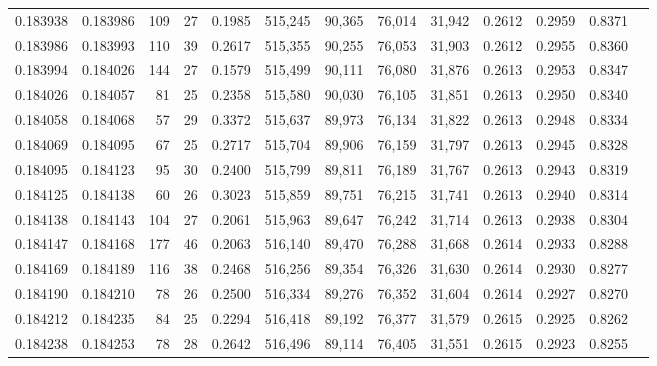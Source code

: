 \begin{tabular}{rrrrrrrrrrrrr}
0.183938 & 0.183986 &   109 &  27 &                                     0.1985 & 515,245 &  90,365 &  76,014 &  31,942 & 0.2612 & 0.2959 & 0.8371 \\
0.183986 & 0.183993 &   110 &  39 &                                     0.2617 & 515,355 &  90,255 &  76,053 &  31,903 & 0.2612 & 0.2955 & 0.8360 \\
0.183994 & 0.184026 &   144 &  27 &                                     0.1579 & 515,499 &  90,111 &  76,080 &  31,876 & 0.2613 & 0.2953 & 0.8347 \\
0.184026 & 0.184057 &    81 &  25 &                                     0.2358 & 515,580 &  90,030 &  76,105 &  31,851 & 0.2613 & 0.2950 & 0.8340 \\
0.184058 & 0.184068 &    57 &  29 &                                     0.3372 & 515,637 &  89,973 &  76,134 &  31,822 & 0.2613 & 0.2948 & 0.8334 \\
0.184069 & 0.184095 &    67 &  25 &                                     0.2717 & 515,704 &  89,906 &  76,159 &  31,797 & 0.2613 & 0.2945 & 0.8328 \\
0.184095 & 0.184123 &    95 &  30 &                                     0.2400 & 515,799 &  89,811 &  76,189 &  31,767 & 0.2613 & 0.2943 & 0.8319 \\
0.184125 & 0.184138 &    60 &  26 &                                     0.3023 & 515,859 &  89,751 &  76,215 &  31,741 & 0.2613 & 0.2940 & 0.8314 \\
0.184138 & 0.184143 &   104 &  27 &                                     0.2061 & 515,963 &  89,647 &  76,242 &  31,714 & 0.2613 & 0.2938 & 0.8304 \\
0.184147 & 0.184168 &   177 &  46 &                                     0.2063 & 516,140 &  89,470 &  76,288 &  31,668 & 0.2614 & 0.2933 & 0.8288 \\
0.184169 & 0.184189 &   116 &  38 &                                     0.2468 & 516,256 &  89,354 &  76,326 &  31,630 & 0.2614 & 0.2930 & 0.8277 \\
0.184190 & 0.184210 &    78 &  26 &                                     0.2500 & 516,334 &  89,276 &  76,352 &  31,604 & 0.2614 & 0.2927 & 0.8270 \\
0.184212 & 0.184235 &    84 &  25 &                                     0.2294 & 516,418 &  89,192 &  76,377 &  31,579 & 0.2615 & 0.2925 & 0.8262 \\
0.184238 & 0.184253 &    78 &  28 &                                     0.2642 & 516,496 &  89,114 &  76,405 &  31,551 & 0.2615 & 0.2923 & 0.8255 \\

\end{tabular}
